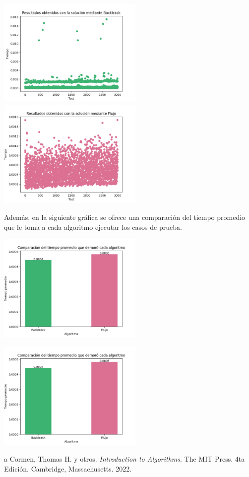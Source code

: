 \documentclass[10pt]{article} %
\begin{document}
    \begin{center}
    	\includegraphics[width=7cm]{Backtrack_results.png}
    	\includegraphics[width=7cm]{Flujo_results.png}
    \end{center}  
    
    Adem\'as, en la siguiente gr\'afica se ofrece una comparaci\'on del tiempo promedio que le toma a cada algoritmo ejecutar los casos de prueba. 
    
    \begin{center}
    	\includegraphics[width=7cm]{Bar_comparative_plot.png}
    \end{center}
	
	\begin{center}
		\includegraphics[width=7cm]{Bar_comparative_plot.png}
	\end{center}
	
	\begin{thebibliography}
		a
		 Cormen, Thomas H. y otros. \emph{Introduction to Algorithms}. 
		The MIT Press.
		4ta Edici\'on.		
		Cambridge, Massachusetts.
		2022.
	\end{thebibliography}
\end{document}
